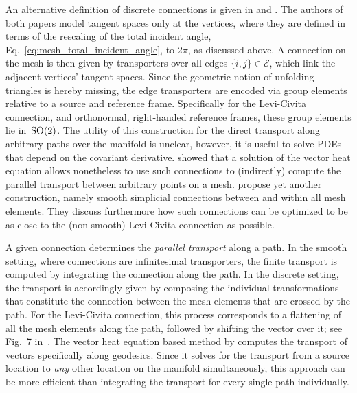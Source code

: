 An alternative definition of discrete connections is given in \cite{Knoppel:2013:GOD} and \cite{Sharp2019VectorHeatMethod}.
The authors of both papers model tangent spaces only at the vertices, where they are defined in terms of the rescaling of the total incident angle, Eq.~\eqref{eq:mesh_total_incident_angle}, to $2\pi$, as discussed above.
A connection on the mesh is then given by transporters over all edges $\{i,j\} \in\mathcal{E}$, which link the adjacent vertices' tangent spaces.
Since the geometric notion of unfolding triangles is hereby missing, the edge transporters are encoded via group elements relative to a source and reference frame.
Specifically for the Levi-Civita connection, and orthonormal, right-handed reference frames, these group elements lie in~$\operatorname{SO}(2)$.
The utility of this construction for the direct transport along arbitrary paths over the manifold is unclear, however, it is useful to solve PDEs that depend on the covariant derivative.
\citet{Sharp2019VectorHeatMethod} showed that a solution of the vector heat equation allows nonetheless to use such connections to (indirectly) compute the parallel transport between arbitrary points on a mesh.
\citet{liu2016discreteConnection} propose yet another construction, namely smooth simplicial connections between and within all mesh elements.
They discuss furthermore how such connections can be optimized to be as close to the (non-smooth) Levi-Civita connection as possible.


A given connection determines the \emph{parallel transport} along a path.
In the smooth setting, where connections are infinitesimal transporters, the finite transport is computed by integrating the connection along the path.
In the discrete setting, the transport is accordingly given by composing the individual transformations that constitute the connection between the mesh elements that are crossed by the path.
For the Levi-Civita connection, this process corresponds to a flattening of all the mesh elements along the path, followed by shifting the vector over it; see Fig.~7 in~\cite{lai2009metric}.
The vector heat equation based method by \citet{Sharp2019VectorHeatMethod} computes the transport of vectors specifically along geodesics.
Since it solves for the transport from a source location to \emph{any} other location on the manifold simultaneously, this approach can be more efficient than integrating the transport for every single path individually.


